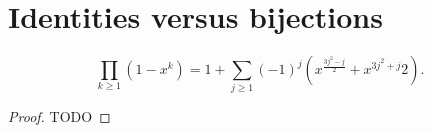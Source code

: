 \chapter{Identities versus bijections}

\begin{theorem}
  \label{ch34theorem}
  \[
  \prod_{k\ge 1}(1 - x^k) = 1 + \sum_{j\ge 1}(-1)^j(x^{\frac{3j^2 - j}{2}} + x^{3j^2 + j}{2}).
  \]
\end{theorem}
\begin{proof}
  TODO
\end{proof}
